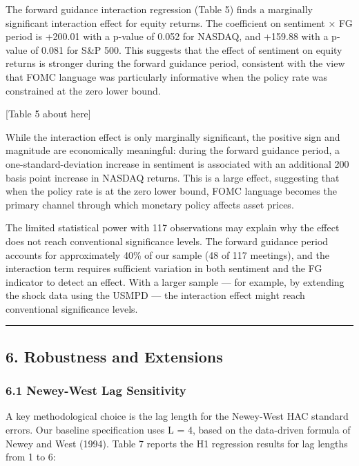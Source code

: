 \documentclass[12pt]{article}
\begin{document}
The forward guidance interaction regression (Table 5) finds a marginally
significant interaction effect for equity returns. The coefficient on
sentiment × FG period is +200.01 with a p-value of 0.052 for NASDAQ, and
+159.88 with a p-value of 0.081 for S\&P 500. This suggests that the
effect of sentiment on equity returns is stronger during the forward
guidance period, consistent with the view that FOMC language was
particularly informative when the policy rate was constrained at the
zero lower bound.

{[}Table 5 about here{]}

While the interaction effect is only marginally significant, the
positive sign and magnitude are economically meaningful: during the
forward guidance period, a one-standard-deviation increase in sentiment
is associated with an additional 200 basis point increase in NASDAQ
returns. This is a large effect, suggesting that when the policy rate is
at the zero lower bound, FOMC language becomes the primary channel
through which monetary policy affects asset prices.

The limited statistical power with 117 observations may explain why the
effect does not reach conventional significance levels. The forward
guidance period accounts for approximately 40\% of our sample (48 of 117
meetings), and the interaction term requires sufficient variation in
both sentiment and the FG indicator to detect an effect. With a larger
sample --- for example, by extending the shock data using the USMPD ---
the interaction effect might reach conventional significance levels.

\begin{center}\rule{0.5\linewidth}{0.5pt}\end{center}

\subsection{6. Robustness and
Extensions}\label{robustness-and-extensions}

\subsubsection{6.1 Newey-West Lag
Sensitivity}\label{newey-west-lag-sensitivity}

A key methodological choice is the lag length for the Newey-West HAC
standard errors. Our baseline specification uses L = 4, based on the
data-driven formula of Newey and West (1994). Table 7 reports the H1
regression results for lag lengths from 1 to 6:
\end{document}
